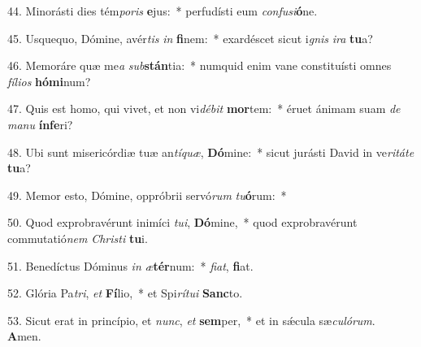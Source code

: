 44. Minorásti dies tém\textit{po}\textit{ris} \textbf{e}jus:~*  perfudísti eum \textit{con}\textit{fu}\textit{si}\textbf{ó}ne.\

45. Usquequo, Dómine, avér\textit{tis} \textit{in} \textbf{fi}nem:~*  exardéscet sicut i\textit{gnis} \textit{i}\textit{ra} \textbf{tu}a?\

46. Memoráre quæ me\textit{a} \textit{sub}\textbf{stán}tia:~*  numquid enim vane constituísti omnes \textit{fí}\textit{li}\textit{os} \textbf{hó}\textbf{mi}num?\

47. Quis est homo, qui vivet, et non vi\textit{dé}\textit{bit} \textbf{mor}tem:~*  éruet ánimam suam \textit{de} \textit{ma}\textit{nu} \textbf{ín}\textbf{fe}ri?\

48. Ubi sunt misericórdiæ tuæ an\textit{tí}\textit{quæ}, \textbf{Dó}mine:~*  sicut jurásti David in ve\textit{ri}\textit{tá}\textit{te} \textbf{tu}a?\

49. Memor esto, Dómine, oppróbrii servó\textit{rum} \textit{tu}\textbf{ó}rum:~*  \

50. Quod exprobravérunt inimíci \textit{tu}\textit{i}, \textbf{Dó}mine,~*  quod exprobravérunt commutatió\textit{nem} \textit{Chris}\textit{ti} \textbf{tu}i.\

51. Benedíctus Dóminus \textit{in} \textit{æ}\textbf{tér}num:~*  \textit{fi}\textit{at}, \textbf{fi}at.\

52. Glória Pa\textit{tri}, \textit{et} \textbf{Fí}lio,~*  et Spi\textit{rí}\textit{tu}\textit{i} \textbf{Sanc}to.\

53. Sicut erat in princípio, et \textit{nunc}, \textit{et} \textbf{sem}per,~*  et in sǽcula sæ\textit{cu}\textit{ló}\textit{rum}. \textbf{A}men.\


